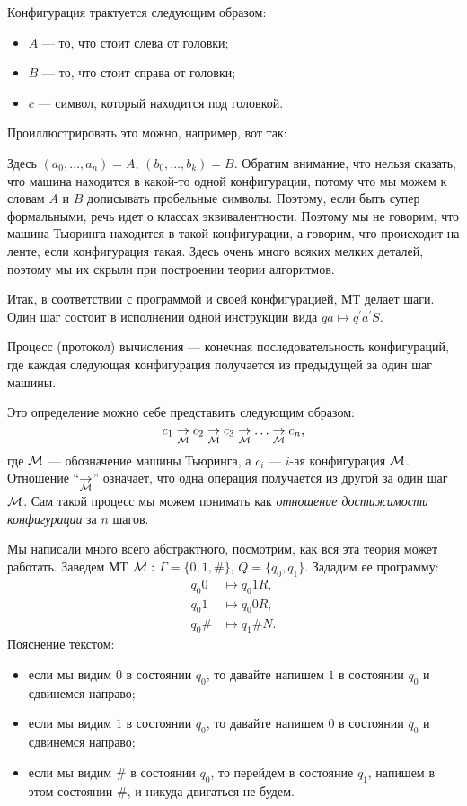 Конфигурация трактуется следующим образом:
\begin{itemize}
    \item $A$ --- то, что стоит слева от головки;
    \item $B$ --- то, что стоит справа от головки;
    \item $c$ --- символ, который находится под головкой.
\end{itemize}
Проиллюстрировать это можно, например, вот так:



Здесь $\left(a_{0}, \ldots, a_{n}\right) = A$, $\left(b_{0}, \ldots, b_{k}\right) = B$.
Обратим внимание, что нельзя сказать, что машина находится в какой-то одной конфигурации, потому что мы можем к словам $A$ и $B$ дописывать пробельные символы.
Поэтому, если быть супер формальными, речь идет о классах эквивалентности.
Поэтому мы не говорим, что машина Тьюринга находится в такой конфигурации, а говорим, что происходит на ленте, если конфигурация такая.
Здесь очень много всяких мелких деталей, поэтому мы их скрыли при построении теории алгоритмов.

Итак, в соответствии с программой и своей конфигурацией, МТ делает шаги.
Один шаг состоит в исполнении одной инструкции вида $q a \mapsto q^{\prime} a^{\prime} S$.

\begin{definition}
    Процесс (протокол) вычисления --- конечная последовательность конфигураций, где каждая следующая конфигурация получается из предыдущей за один шаг машины.
\end{definition}

Это определение можно себе представить следующим образом:
$$
    c_{1} \underset{\mathcal{M}}{\to} c_{2} \underset{\mathcal{M}}{\to} c_{3} \underset{\mathcal{M}}{\to} \ldots \underset{\mathcal{M}}{\to} c_{n},
$$
где $\mathcal{M}$ --- обозначение машины Тьюринга, а $c_{i}$ --- $i$-ая конфигурация $\mathcal{M}$.
Отношение \enquote{$\underset{\mathcal{M}}{\to}$} означает, что одна операция получается из другой за один шаг $\mathcal{M}$.
Сам такой процесс мы можем понимать как {\it отношение достижимости конфигурации} за $n$ шагов.

Мы написали много всего абстрактного, посмотрим, как вся эта теория может работать.
Заведем МТ $\mathcal{M}:$ $\Gamma = \{0, 1, \#\}$, $Q = \{q_{0}, q_{1}\}$.
Зададим ее программу: 
\begin{align}
    q_{0} 0 &\mapsto q_{0} 1 R, \\
    q_{0} 1 &\mapsto q_{0} 0 R, \\
    q_{0} \# &\mapsto q_{1} \# N.
\end{align}
Пояснение текстом: 
\begin{itemize}
    \item если мы видим $0$ в состоянии $q_{0}$, то давайте напишем $1$ в состоянии $q_{0}$ и сдвинемся направо;
    \item если мы видим $1$ в состоянии $q_{0}$, то давайте напишем $0$ в состоянии $q_{0}$ и сдвинемся направо;
    \item если мы видим \# в состоянии $q_{0}$, то перейдем в состояние $q_{1}$, напишем в этом состоянии \#, и никуда двигаться не будем.
\end{itemize}

